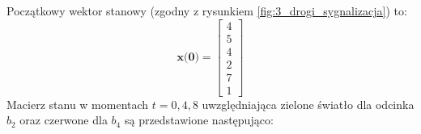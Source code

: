 \documentclass[12pt]{book}
\theoremstyle{plain}
\begin{document}
\def \xzero{
	\begin{bmatrix}
		4 \\ 5 \\ 4 \\ 2 \\ 7 \\ 1
	\end{bmatrix}
}
Początkowy wektor stanowy (zgodny z rysunkiem \ref{fig:3_drogi_sygnalizacja}) to:
\[\textbf{x(0)}= \xzero \]
Macierz stanu w momentach $t=0,4,8$ uwzględniająca zielone światło dla odcinka $b_2$ oraz czerwone dla $b_4$ są przedstawione następująco:
\def \aeI{
\begin{bmatrix}
	0 & 0                     & 0 & 0 & 0 & 0 \\
	1 & \colorbox{red!30}{0}  & 0 & 0 & 0 & 0 \\
	0 & 0                     & 0 & 0 & 0 & 0 \\
	0 & 0                     & 1 & \colorbox{red!30}{1} & 0 & 0 & \\
	0 & \colorbox{green!30}{1}  & 0 & \colorbox{green!30}{0} & 0 & 0 \\
	0 & 0                     & 0 & 0 & 1 & 0 \\
\end{bmatrix}

}
\end{document}
